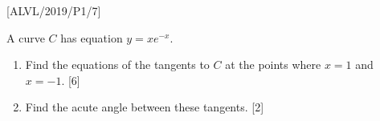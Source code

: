 \item {[}ALVL/2019/P1/7{]}

A curve $C$ has equation $y=xe^{-x}$. 
\begin{enumerate}
\item Find the equations of the tangents to $C$ at the points where $x=1$
and $x=-1$. \hfill{}{[}6{]}
\item Find the acute angle between these tangents.\hfill{} {[}2{]}
\end{enumerate}
